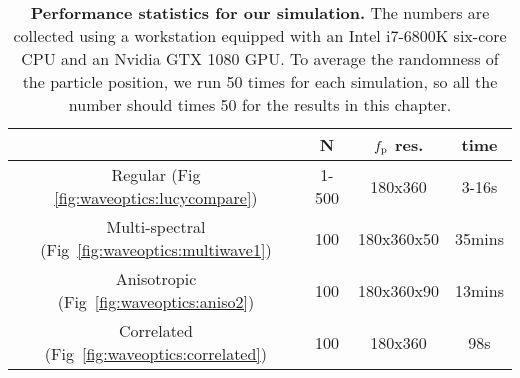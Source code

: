 \begin{table}[h]
	\centering
	\addtolength{\tabcolsep}{5pt}
    \caption[Performance statistics for our simulation]{\label{fig:waveoptics:time}
        \textbf{Performance statistics for our simulation.}
		The numbers are collected using a workstation equipped with an Intel i7-6800K six-core CPU and an Nvidia GTX 1080 GPU.
		To average the randomness of the particle position, we run 50 times for each simulation, so all the number should times 50 for the results in this chapter.
    }
    \begin{tabular}{cccc}
                                                               & N     & $f_\mathrm{p}$ res.    & time   \\
    \hline
    Regular (Fig \ref{fig:waveoptics:lucycompare})             & 1-500 &  180x360         & 3-16s  \\
    Multi-spectral (Fig~\ref{fig:waveoptics:multiwave1})       & 100   &  180x360x50      & 35mins \\
    Anisotropic (Fig~\ref{fig:waveoptics:aniso2})              & 100   &  180x360x90      & 13mins \\
    Correlated (Fig~\ref{fig:waveoptics:correlated})           & 100   &  180x360         & 98s    \\
    \end{tabular}
\end{table}
